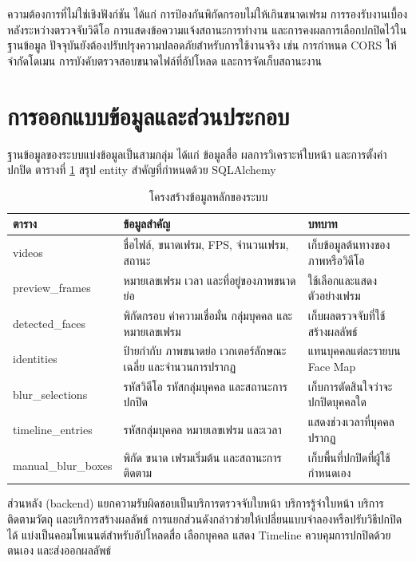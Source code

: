 ความต้องการที่ไม่ใช่เชิงฟังก์ชัน ได้แก่ การป้องกันพิกัดกรอบไม่ให้เกินขนาดเฟรม การรองรับงานเบื้องหลังระหว่างตรวจจับวิดีโอ การแสดงข้อความแจ้งสถานะการทำงาน และการคงผลการเลือกปกปิดไว้ในฐานข้อมูล ปัจจุบันยังต้องปรับปรุงความปลอดภัยสำหรับการใช้งานจริง เช่น การกำหนด CORS ให้จำกัดโดเมน การบังคับตรวจสอบขนาดไฟล์ที่อัปโหลด และการจัดเก็บสถานะงาน

\section{การออกแบบข้อมูลและส่วนประกอบ}

ฐานข้อมูลของระบบแบ่งข้อมูลเป็นสามกลุ่ม ได้แก่ ข้อมูลสื่อ ผลการวิเคราะห์ใบหน้า และการตั้งค่าปกปิด ตารางที่ \ref{tab:data-model} สรุป entity สำคัญที่กำหนดด้วย SQLAlchemy

\begingroup
\setlength{\intextsep}{0.4\baselineskip}
\renewcommand{\arraystretch}{1.1}
\captionsetup[table]{skip=0.5\baselineskip}
\begin{table}[H]
\centering
\caption{โครงสร้างข้อมูลหลักของระบบ}
\label{tab:data-model}
\begin{tabular}{|p{}|p{}|p{}|}
\hline
\textbf{ตาราง} & \textbf{ข้อมูลสำคัญ} & \textbf{บทบาท} \\
\hline
videos & ชื่อไฟล์, ขนาดเฟรม, FPS, จำนวนเฟรม, สถานะ & เก็บข้อมูลต้นทางของภาพหรือวิดีโอ \\
\hline
preview\_frames & หมายเลขเฟรม เวลา และที่อยู่ของภาพขนาดย่อ & ใช้เลือกและแสดงตัวอย่างเฟรม \\
\hline
detected\_faces & พิกัดกรอบ ค่าความเชื่อมั่น กลุ่มบุคคล และหมายเลขเฟรม & เก็บผลตรวจจับที่ใช้สร้างผลลัพธ์ \\
\hline
identities & ป้ายกำกับ ภาพขนาดย่อ เวกเตอร์ลักษณะเฉลี่ย และจำนวนการปรากฏ & แทนบุคคลแต่ละรายบน Face Map \\
\hline
blur\_selections & รหัสวิดีโอ รหัสกลุ่มบุคคล และสถานะการปกปิด & เก็บการตัดสินใจว่าจะปกปิดบุคคลใด \\
\hline
timeline\_entries & รหัสกลุ่มบุคคล หมายเลขเฟรม และเวลา & แสดงช่วงเวลาที่บุคคลปรากฏ \\
\hline
manual\_blur\_boxes & พิกัด ขนาด เฟรมเริ่มต้น และสถานะการติดตาม & เก็บพื้นที่ปกปิดที่ผู้ใช้กำหนดเอง \\
\hline
\end{tabular}
\end{table}
\endgroup

\begin{samepage}
ส่วนหลัง (backend) แยกความรับผิดชอบเป็นบริการตรวจจับใบหน้า บริการรู้จำใบหน้า บริการติดตามวัตถุ และบริการสร้างผลลัพธ์ การแยกส่วนดังกล่าวช่วยให้เปลี่ยนแบบจำลองหรือปรับวิธีปกปิดได้ แบ่งเป็นคอมโพเนนต์สำหรับอัปโหลดสื่อ เลือกบุคคล แสดง Timeline ควบคุมการปกปิดด้วยตนเอง และส่งออกผลลัพธ์\par
\end{samepage}

